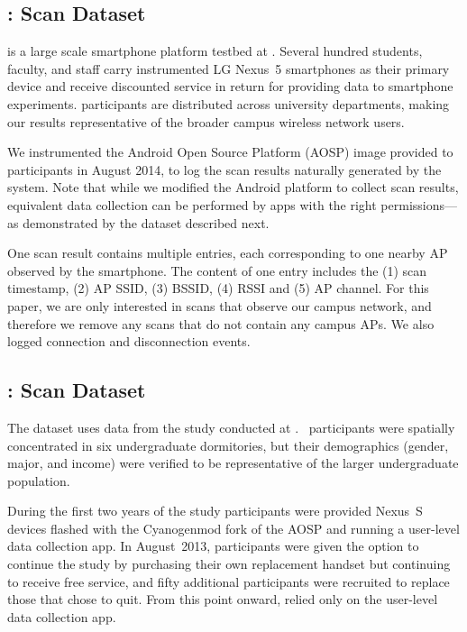 \subsection{\ubscan{}: \PhoneLab{} \wifi{} Scan Dataset}
\label{sec:phonelab}

\PhoneLab{} is a large scale smartphone platform testbed at \ub{}. Several hundred students,
faculty, and staff carry instrumented LG Nexus~5 smartphones as their primary
device and receive discounted service in return for providing data to smartphone
experiments. \PhoneLab{} participants are distributed across university
departments, making our results representative of the broader campus wireless
network users.

We instrumented the \PhoneLab{} Android Open Source Platform (AOSP)
image provided to participants in August 2014, to log the \wifi{} scan
results naturally generated by the system. Note that while we modified the Android platform to
collect scan results, equivalent data collection can be performed by apps
with the right permissions---as demonstrated by the \ndscan{} dataset described
next.

One scan result contains multiple entries, each corresponding to one nearby
\wifi{} AP observed by the smartphone. The content of one entry includes the
(1) scan timestamp, (2) AP SSID, (3) BSSID, (4) RSSI and (5) AP channel. For
this paper, we are only interested in \wifi{} scans that observe our campus
network, and therefore we remove any scans that do not contain any campus
APs. We also logged \wifi{} connection and disconnection events.


\subsection{\ndscan{}: \NetSense{} \wifi{} Scan Dataset}
\label{sec:netsense}

The \ndscan{} dataset uses data from the \NetSense{} study
conducted at \nd{}.
\NetSense{}~participants were spatially concentrated in six undergraduate
dormitories, but their demographics (gender, major, and income) were verified
to be representative of the larger undergraduate population.

During the first two years of the study \NetSense{} participants were
provided Nexus~S devices flashed with the Cyanogenmod fork of the AOSP and
running a user-level data collection app. In August~2013, participants were
given the option to continue the study by purchasing their own replacement
handset but continuing to receive free service, and fifty additional
participants were recruited to replace those that chose to quit. From this
point onward, \NetSense{} relied only on the user-level data collection app.

